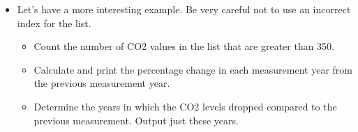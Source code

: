 \documentclass[letterpaper,10pt,english]{sphinxmanual}
\begin{document}
\begin{itemize}
\begin{sphinxVerbatim}[commandchars=\\\{\}]
   
      \PYG{p}{[}\PYG{p}{]}\PYG{p}{[}\PYG{p}{]}
      

 
\end{sphinxVerbatim}

\item {} 
Let’s have a more interesting example. Be very careful not to use
an incorrect index for the list.
\begin{itemize}
\item {} 
Count the number of CO2 values in the list that are greater
than 350.

\item {} 
Calculate and print the percentage change in each measurement year
from the previous measurement year.

\item {} 
Determine the years in which the CO2 levels dropped compared to the
previous measurement. Output just these years.

\end{itemize}

\end{itemize}
\end{document}

